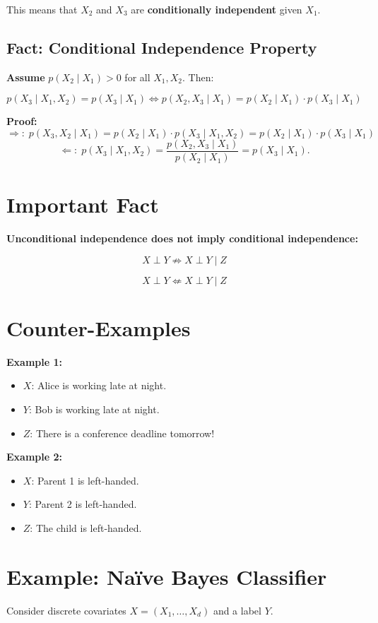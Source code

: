 \documentclass{article}%
\begin{document}
This means that \( X_2 \) and \( X_3 \) are \textbf{conditionally independent} given \( X_1 \).

\subsection*{Fact: Conditional Independence Property}
\textbf{Assume} \( p(X_2 \mid X_1) > 0 \) for all \( X_1, X_2 \). Then:

\[
p(X_3 \mid X_1, X_2) = p(X_3 \mid X_1) \iff p(X_2, X_3 \mid X_1) = p(X_2 \mid X_1) \cdot p(X_3 \mid X_1)
\]

\textbf{Proof:}
\[
\Rightarrow \text{:}\ \  p(X_3, X_2 \mid X_1) = p(X_2 \mid X_1) \cdot p(X_3 \mid X_1, X_2)
= p(X_2 \mid X_1) \cdot p(X_3 \mid X_1)
\]
\[
\Leftarrow \text{:}\ \  p(X_3 \mid X_1, X_2) = \frac{p(X_2, X_3 \mid X_1)}{p(X_2 \mid X_1)} = p(X_3 \mid X_1).
\]


\section*{Important Fact}
\textbf{Unconditional independence does not imply conditional independence:}

\[
X \perp Y \not\Rightarrow X \perp Y \mid Z
\]

\[
X \perp Y \not\Leftarrow X \perp Y \mid Z
\]

\section*{Counter-Examples}
\textbf{Example 1:}
\begin{itemize}
    \item \( X \): Alice is working late at night.
    \item \( Y \): Bob is working late at night.
    \item \( Z \): There is a conference deadline tomorrow!
\end{itemize}

\textbf{Example 2:}
\begin{itemize}
    \item \( X \): Parent 1 is left-handed.
    \item \( Y \): Parent 2 is left-handed.
    \item \( Z \): The child is left-handed.
\end{itemize}

\section*{Example: Naïve Bayes Classifier}
Consider discrete covariates \( X = (X_1, \dots, X_d) \) and a label \( Y \).
\end{document}
